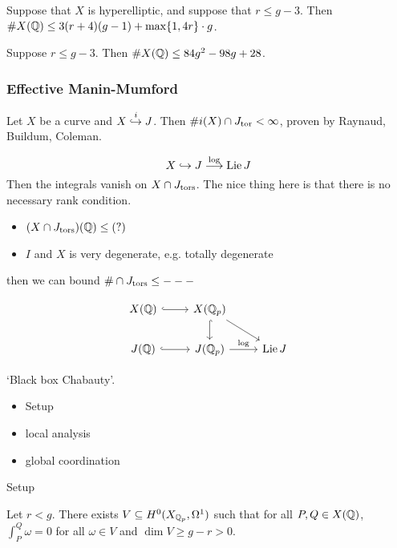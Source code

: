\begin{thm}[Stoll]
Suppose that $X$ is hyperelliptic, and suppose that $r \leq g-3$. Then $\#X(\mathbb{Q}) \leq 3(r+4)(g-1) + \max\{1,4r\} \cdot g$.
\end{thm}


\begin{thm}
Suppose $r \leq g-3$. Then $\#X(\mathbb{Q}) \leq 84 g^2 - 98g + 28$. 
\end{thm}



\subsubsection{Effective Manin-Mumford}

Let $X$ be a curve and $X \stackrel{i}{\hookrightarrow} J$. Then $\#i(X) \cap J_{\text{tor}} < \infty$, proven by Raynaud, Buildum, Coleman.

	\[
	X \hookrightarrow J \stackrel{\log}{\longrightarrow} \operatorname{Lie} J
	\]
Then the integrals vanish on $X \cap J_{\text{tors}}$. The nice thing here is that there is no necessary rank condition. 


\begin{thm}[KRZB]
\begin{itemize}
\item $(X \cap J_{\text{tors}})(\mathbb{Q}) \leq (?)$
\item $I$ and $X$ is very degenerate, e.g. totally degenerate
\end{itemize}
then we can bound $\# \cap J_{\text{tors}} \leq ---$
\end{thm}


	\[
	\begin{tikzcd}
	X(\Q) \arrow[hook]{r} & X(\Q_p) \arrow[hook]{d} \arrow{dr} \\
	J(\Q) \arrow[hook]{r} & J(\Q_p) \arrow{r}{\log} &  \lie J
	\end{tikzcd}
	\]


`Black box Chabauty'.

\begin{itemize}
\item Setup
\item local analysis
\item global coordination 
\end{itemize}


Setup

Let $r<g$. There exists $V \subseteq H^0(X_{\mathbb{Q}_p}, \Omega^1)$ such that for all $P,Q \in X(\mathbb{Q})$, $\int_P^Q \omega= 0$ for all $\omega \in V$ and $\dim V \geq g-r > 0$.



